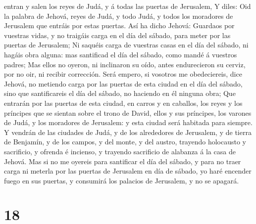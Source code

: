 entran y salen los reyes de Judá, y á todas las puertas de Jerusalem,
 Y diles: Oid la palabra de Jehová, reyes de Judá, y todo
Judá, y todos los moradores de Jerusalem que entráis por estas puertas.
 Así ha dicho Jehová: Guardaos por vuestras vidas, y no
traigáis carga en el día del sábado, para meter por las puertas de
Jerusalem;  Ni saquéis carga de vuestras casas en el día
del sábado, ni hagáis obra alguna: mas santificad el día del sábado,
como mandé á vuestros padres;  Mas ellos no oyeron, ni
inclinaron su oído, antes endurecieron su cerviz, por no oir, ni recibir
corrección.  Será empero, si vosotros me obedeciereis, dice
Jehová, no metiendo carga por las puertas de esta ciudad en el día del
sábado, sino que santificareis el día del sábado, no haciendo en él
ninguna obra;  Que entrarán por las puertas de esta ciudad,
en carros y en caballos, los reyes y los príncipes que se sientan sobre
el trono de David, ellos y sus príncipes, los varones de Judá, y los
moradores de Jerusalem: y esta ciudad será habitada para siempre.
 Y vendrán de las ciudades de Judá, y de los alrededores de
Jerusalem, y de tierra de Benjamín, y de los campos, y del monte, y del
austro, trayendo holocausto y sacrificio, y ofrenda é incienso, y
trayendo sacrificio de alabanza á la casa de Jehová.  Mas
si no me oyereis para santificar el día del sábado, y para no traer
carga ni meterla por las puertas de Jerusalem en día de sábado, yo haré
encender fuego en sus puertas, y consumirá los palacios de Jerusalem, y
no se apagará.

\hypertarget{section-17}{%
\section{18}\label{section-17}}

